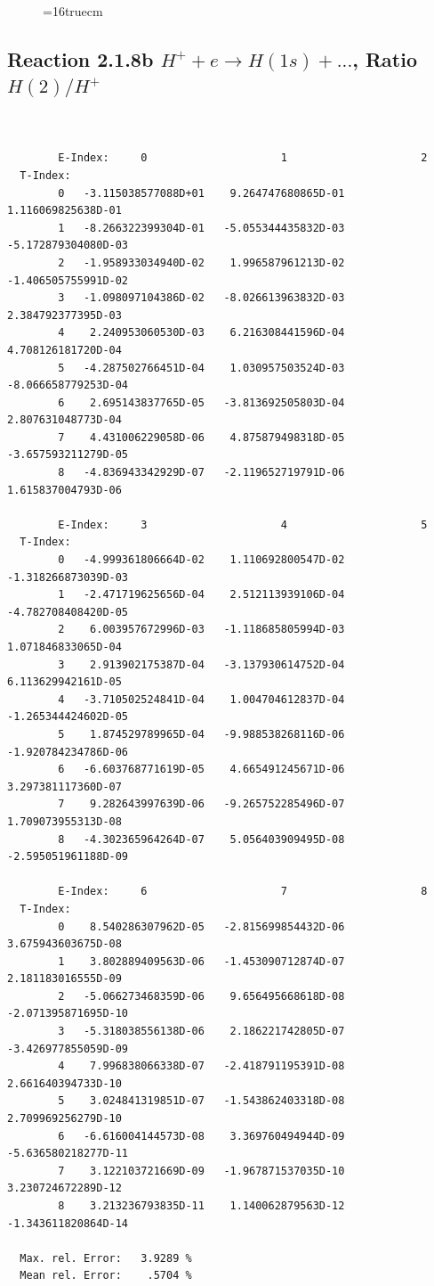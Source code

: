 \documentclass[12pt,dvips]{article}
\begin{document}
\begin{figure} \label{2.1.8ra}
\epsfxsize=16truecm
\end{figure}
\newpage



\subsection{
Reaction 2.1.8b  $H^+ + e \rightarrow H(1s) + ...$,  Ratio $H(2)/H^+$
}

\begin{small}\begin{verbatim}


        E-Index:     0                     1                     2
  T-Index:
        0   -3.115038577088D+01    9.264747680865D-01    1.116069825638D-01
        1   -8.266322399304D-01   -5.055344435832D-03   -5.172879304080D-03
        2   -1.958933034940D-02    1.996587961213D-02   -1.406505755991D-02
        3   -1.098097104386D-02   -8.026613963832D-03    2.384792377395D-03
        4    2.240953060530D-03    6.216308441596D-04    4.708126181720D-04
        5   -4.287502766451D-04    1.030957503524D-03   -8.066658779253D-04
        6    2.695143837765D-05   -3.813692505803D-04    2.807631048773D-04
        7    4.431006229058D-06    4.875879498318D-05   -3.657593211279D-05
        8   -4.836943342929D-07   -2.119652719791D-06    1.615837004793D-06

        E-Index:     3                     4                     5
  T-Index:
        0   -4.999361806664D-02    1.110692800547D-02   -1.318266873039D-03
        1   -2.471719625656D-04    2.512113939106D-04   -4.782708408420D-05
        2    6.003957672996D-03   -1.118685805994D-03    1.071846833065D-04
        3    2.913902175387D-04   -3.137930614752D-04    6.113629942161D-05
        4   -3.710502524841D-04    1.004704612837D-04   -1.265344424602D-05
        5    1.874529789965D-04   -9.988538268116D-06   -1.920784234786D-06
        6   -6.603768771619D-05    4.665491245671D-06    3.297381117360D-07
        7    9.282643997639D-06   -9.265752285496D-07    1.709073955313D-08
        8   -4.302365964264D-07    5.056403909495D-08   -2.595051961188D-09

        E-Index:     6                     7                     8
  T-Index:
        0    8.540286307962D-05   -2.815699854432D-06    3.675943603675D-08
        1    3.802889409563D-06   -1.453090712874D-07    2.181183016555D-09
        2   -5.066273468359D-06    9.656495668618D-08   -2.071395871695D-10
        3   -5.318038556138D-06    2.186221742805D-07   -3.426977855059D-09
        4    7.996838066338D-07   -2.418791195391D-08    2.661640394733D-10
        5    3.024841319851D-07   -1.543862403318D-08    2.709969256279D-10
        6   -6.616004144573D-08    3.369760494944D-09   -5.636580218277D-11
        7    3.122103721669D-09   -1.967871537035D-10    3.230724672289D-12
        8    3.213236793835D-11    1.140062879563D-12   -1.343611820864D-14

  Max. rel. Error:   3.9289 %
  Mean rel. Error:    .5704 %

\end{verbatim}\end{small}
\end{document}

